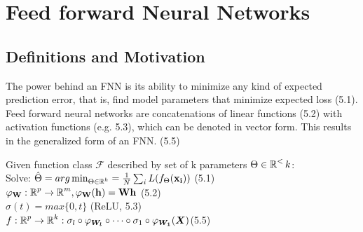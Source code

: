 \documentclass[english]{latex4ei/latex4ei_sheet}
\begin{document}
\section{Feed forward Neural Networks}
\begin{sectionbox}
\subsection{Definitions and Motivation}
The power behind an FNN is its ability to minimize any kind of expected prediction error, that is, find model parameters that minimize expected loss (5.1). Feed forward neural networks are concatenations of linear functions (5.2) with activation functions (e.g. 5.3), which can be denoted in vector form. This results in the generalized form of an FNN. (5.5)
\begin{emphbox}
    Given function class $\mathcal{F}$ described by set of k parameters $\Theta\in\operatorname{\mathbb R}^<k$:\\
    Solve: $\hat{\Theta}=arg\min_{\Theta\in\operatorname{\mathbb R}^k}=\frac{1}{N}\sum_iL(f_\Theta(\mathbf{x_i}))$ (5.1)\\
    $\varphi_\mathbf{W}:\operatorname{\mathbb R}^p\rightarrow\operatorname{\mathbb R}^m, \varphi_\mathbf{W}(\mathbf{h})=\mathbf{Wh}$ (5.2)\\
    $\sigma(t)=max\{0,t\}$ (ReLU, 5.3)\\
    $f:\operatorname{\mathbb R}^p \rightarrow \operatorname{\mathbb R}^k: \sigma_l\circ\varphi_{\boldsymbol{W_l}}\circ\cdots\circ\sigma_1\circ\varphi_{\boldsymbol{W_1}}(\boldsymbol{X})$(5.5)
\end{emphbox}

\end{sectionbox}
\end{document}
